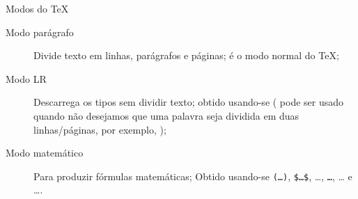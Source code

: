 \begin{frame}{Modos do \TeX}
\begin{description}
\item [Modo parágrafo] Divide texto em linhas, parágrafos e páginas; é o modo normal do \TeX;
\item [Modo LR] Descarrega os tipos sem dividir texto; obtido usando-se  ( pode ser usado quando não desejamos que uma palavra seja dividida em duas linhas/páginas, por exemplo, );
\item [Modo matemático] Para produzir fórmulas matemáticas; Obtido usando-se \texttt{\bs(\dots\bs)}, \texttt{\$\dots\$}, \dots{}, \texttt{\bs\ls\dots\bs\rs}, \dots {} e \dots {}.
\end{description}
\end{frame}

